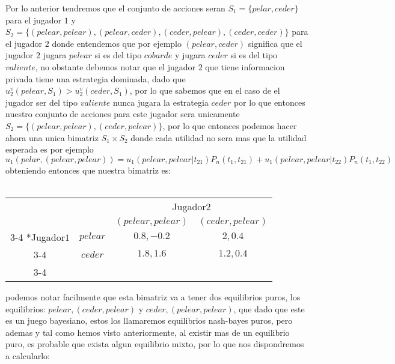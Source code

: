 \documentclass[11pt]{article}
\begin{document}
\begin{flushleft}
\begin{example}
\begin{flushleft}
            Por lo anterior tendremos que el conjunto de acciones seran $S_1 = \{pelar, ceder\}$ para el jugador $1$ y $S_2=\{(pelear, pelear), (pelear, ceder), (ceder, pelear), (ceder, ceder)\}$ para el jugador $2$ donde entendemos que por ejemplo $(pelear, ceder)$ significa que el jugador $2$ jugara $pelear$ si es del tipo $cobarde$ y jugara $ceder$ si es del tipo $valiente$, no obstante debemos notar que el jugador $2$ que tiene informacion privada tiene una estrategia dominada, dado que $u_{2}^v (pelear,S_1) > u_{2}^v (ceder,S_1)$, por lo que sabemos que en el caso de el jugador ser del tipo $valiente$ nunca jugara la estrategia $ceder$ por lo que entonces nuestro conjunto de acciones para este jugador sera unicamente $S_2=\{(pelear, pelear), (ceder, pelear)\}$, por lo que entonces podemos hacer ahora una unica bimatriz $S_1 \times S_2$ donde cada utilidad no sera mas que la utilidad esperada es por ejemplo $$u_1(pelar, (pelear,pelear))=u_1(pelear,pelear|t_{21})P_n(t_1,t_{21})+u_1(pelear,pelear|t_{22})P_n(t_1,t_{22})$$ obteniendo entonces que nuestra bimatriz es:\\~\\
            
            \begin{center}    
                \setlength{\extrarowheight}{0pt}
                \begin{tabular}{cc|c|c|}
                    & \multicolumn{1}{c}{} & \multicolumn{2}{c}{Jugador$2$}\\
                    & \multicolumn{1}{c}{} & \multicolumn{1}{c}{$(pelear,pelear)$}  & \multicolumn{1}{c}{$(ceder,pelear)$} \\\cline{3-4}
                    \multirow{2}*{Jugador$1$}  & $pelear$ & $0.8,-0.2$ & $2,0.4$ \\\cline{3-4}
                    & $ceder$ & $1.8,1.6$ & $1.2,0.4$ \\\cline{3-4}
                \end{tabular}
            \end{center}

            podemos notar facilmente que esta bimatriz va a tener dos equilibrios puros, los equilibrios: $pelear, (ceder, pelear)$ y $ceder, (pelear,pelear)$, que dado que este es un juego bayesiano, estos los llamaremos equilibrios nash-bayes puros, pero ademas y tal como hemos visto anteriormente, al existir mas de un equilibrio puro, es probable que exista algun equilibrio mixto, por lo que nos dispondremos a calcularlo:


\end{flushleft}
\end{example}
\end{flushleft}
\end{document}
